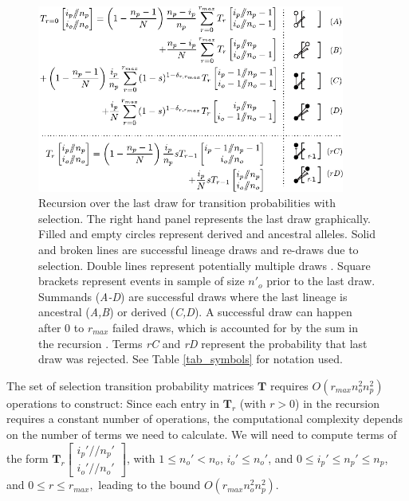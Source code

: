 \documentclass[review,nonatbib]{elsarticle}
\newcommand{\dslash}{/\!\!/}
\newcommand{\Coalc}[4]{\begin{bmatrix}#1\dslash #2 \\ #3\dslash #4 \end{bmatrix}}
\newcommand{\sgcomment}[1]{{\color{red}{SG: #1}}}
\begin{document}
\begin{figure}
  \centering
  \includegraphics[width=0.9\textwidth]{fig/recurrence-selection-dynamic-failures-annotated.pdf}

  \caption{Recursion over the last draw for transition probabilities with selection. 
    The right hand panel represents the last draw graphically.
    Filled and empty circles represent derived and ancestral alleles. 
    Solid and broken lines are
    successful lineage draws and re-draws due to selection. Double lines represent potentially
    multiple draws \sgcomment{I think we should just remove the double lines, since they don't 
    pertain to the last draw and complicate the graph. Also, the $r-1$ label in bottom right}. 
    Square brackets represent events in sample of size $n'_o$ prior to the last draw. Summands
    (\textit{A-D}) are successful draws where the last lineage is ancestral (\textit{A,B}) or
    derived (\textit{C,D}). A successful draw can happen after
    $0$ to $r_{max}$ failed draws, which is accounted for by the sum in the recursion . Terms \textit{rC} and \textit{rD}
    represent the probability that last draw was rejected. See Table \ref{tab_symbols} for notation used.
  }

  \label{fig_rec_selection_dynamic_fail}
\end{figure}

The set of selection transition probability matrices $\mathbf{T}$ requires $O(r_{max}n_o^2 n_p^2)$
operations to construct: Since each entry in $\mathbf{T}_{r}$ (with $r>0$)  in the recursion requires a
constant number of operations, the computational complexity depends on the number of terms we need
to calculate. We will need to compute terms of the form
$\mathbf{T}_{r}\Coalc{i_p'}{n_p'}{i_o'}{n_o'}$, with $1 \leq n_o'<n_o$, $i_o' \leq n_o'$, and $0\leq
i_p' \leq n_p' \leq n_p$, and $0\leq r \leq r_{max},$ leading to the bound $O(r_{max}n_o^2 n_p^2).$
\end{document}

